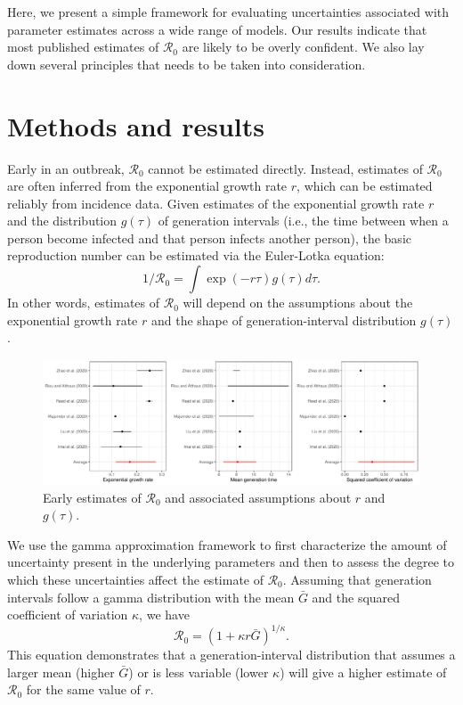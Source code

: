 \documentclass[12pt]{article}
\begin{document}
Here, we present a simple framework for evaluating uncertainties 
associated with parameter estimates
across a wide range of models.
Our results indicate that most published estimates of $\mathcal R_0$
are likely to be overly confident. 
We also lay down several principles that needs to be taken into
consideration.

\section{Methods and results}

Early in an outbreak, $\mathcal R_0$ cannot be estimated directly.
Instead, estimates of $\mathcal R_0$ are often inferred from
the exponential growth rate $r$, which can be estimated reliably from incidence data.
Given estimates of the exponential growth rate $r$ and the distribution $g(\tau)$ of
generation intervals (i.e., the time between when a person become 
infected and that person infects another person), the basic reproduction
number can be estimated via the Euler-Lotka equation:
\begin{equation}
1/\mathcal R_0 = \int \exp(-r\tau) g(\tau) d\tau.
\end{equation}
In other words, estimates of $\mathcal R_0$
will depend on the assumptions about the
exponential growth rate $r$ and the shape of generation-interval distribution $g(\tau)$.

\begin{figure}[t]
\includegraphics[width=\textwidth]{compare_assumption.pdf}
\caption{
Early estimates of $\mathcal R_0$ and associated assumptions about $r$ and $g(\tau)$.
}
\end{figure}

We use the gamma approximation framework to first characterize the
amount of uncertainty present in the underlying parameters and then 
to assess the 
degree to which these uncertainties
affect the estimate of $\mathcal R_0$.
Assuming that generation intervals follow a gamma distribution 
with the mean $\bar G$ and the squared coefficient of variation $\kappa$, 
we have
\begin{equation}
\mathcal R_0 = \left(1 + \kappa r \bar{G}\right)^{1/\kappa}.
\end{equation}
This equation demonstrates that a generation-interval distribution
that assumes a larger mean (higher $\bar{G}$) or is less variable (lower $\kappa$)
will give a higher estimate of $\mathcal R_0$ for the same value of $r$.
\end{document}
